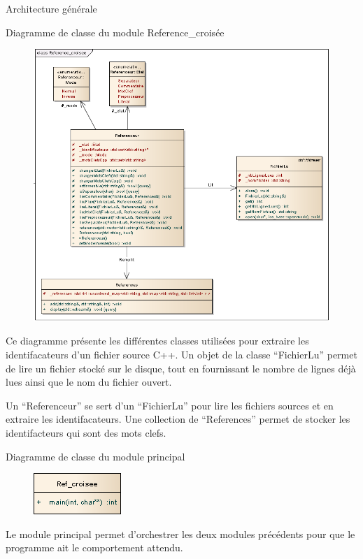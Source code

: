 \documentclass{article}
\begin{document}
\begin{section}{Architecture générale}
   \begin{subsection}{Diagramme de classe du module Reference\_croisée}
    \begin{figure}[!ht]
      \begin{center}
	\includegraphics[scale=0.5]{./diagrammeClasse_reference.png}
      \end{center}
    \end{figure}
    \FloatBarrier
     Ce diagramme présente les différentes classes utilisées pour extraire les identifacateurs d'un fichier source C++.
      Un objet de la classe ``FichierLu'' permet de lire un fichier stocké sur le disque, tout en fournissant le nombre de lignes déjà 
      lues ainsi que le nom du fichier ouvert. 
      
      Un ``Referenceur'' se sert d'un ``FichierLu'' pour lire les fichiers sources et en extraire les identifacateurs.
      Une collection de ``References'' permet de stocker les identifacteurs qui sont des mots clefs.
   \end{subsection}
   
   \newpage
    \begin{subsection}{Diagramme de classe du module principal}
    \begin{figure}[!ht]
      \begin{center}
	\includegraphics[scale=0.5]{./diagrammeClasse_main.png}
      \end{center}
    \end{figure}
    \FloatBarrier
    Le module principal permet d'orchestrer les deux modules précédents pour que le programme ait le comportement attendu.
   \end{subsection}

\end{section}
\end{document}
